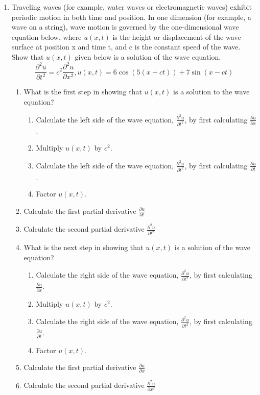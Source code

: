 \documentclass[12 pt]{article}
\begin{document}
\begin{enumerate}
    \item Traveling waves (for example, water waves or electromagnetic waves) exhibit periodic motion in both time and position. In one dimension (for example, a wave on a string), wave motion is governed by the one-dimensional wave equation below, where $u(x,t)$ is the height or displacement of the wave surface at position x and time t, and c is the constant speed of the wave. Show that $u(x,t)$ given below is a solution of the wave equation.
    \[
        \frac{\partial^2 u}{\partial t^2} = c^2\frac{\partial^2 u}{\partial x^2}, u(x,t) = 6\cos(5(x + ct)) + 7\sin(x - ct)
    \]
    \begin{enumerate}
        \item What is the first step in showing that $u(x,t)$ is a solution to the wave equation?
        \begin{enumerate}[label=\Alph*.] 
            \item Calculate the left side of the wave equation, $\frac{\partial^2 u}{\partial t^2}$, by first calculating $\frac{\partial u}{\partial x}$.
            \item Multiply $u(x,t)$ by $c^2$.
            \item Calculate the left side of the wave equation, $\frac{\partial^2 u}{\partial t^2}$, by first calculating $\frac{\partial u}{\partial t}$.
            \item Factor $u(x,t)$.
        \end{enumerate}
        \item Calculate the first partial derivative $\frac{\partial u}{\partial t}$
        \item Calculate the second partial derivative $\frac{\partial^2 u}{\partial t^2}$
        \item What is the next step in showing that $u(x,t)$ is a solution of the wave equation?
        \begin{enumerate}[label=\Alph*.] 
            \item Calculate the right side of the wave equation, $\frac{\partial^2 u}{\partial t^2}$, by first calculating $\frac{\partial u}{\partial x}$.
            \item Multiply $u(x,t)$ by $c^2$.
            \item Calculate the right side of the wave equation, $\frac{\partial^2 u}{\partial t^2}$, by first calculating $\frac{\partial u}{\partial t}$.
            \item Factor $u(x,t)$.
        \end{enumerate}
        \item Calculate the first partial derivative $\frac{\partial u}{\partial x}$
        \item Calculate the second partial derivative $\frac{\partial^2 u}{\partial x^2}$
    \end{enumerate}

\end{enumerate}
\end{document}
